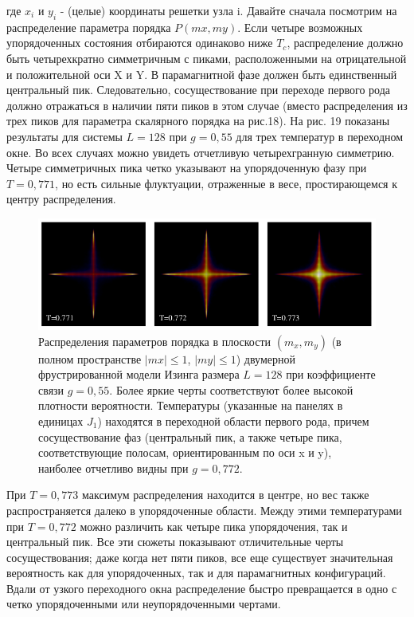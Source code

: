 \documentclass[11pt]{article}
\begin{document}
где $x_i$ и $y_i$ - (целые) координаты решетки узла i. Давайте сначала посмотрим на распределение параметра порядка $P(m x, m y)$. Если четыре возможных упорядоченных состояния отбираются одинаково ниже $T_c$, распределение должно быть четырехкратно симметричным с пиками, расположенными
на отрицательной и положительной оси X и Y. В парамагнитной фазе должен быть единственный центральный пик. Следовательно, сосуществование при переходе первого рода должно отражаться в наличии пяти пиков в этом случае (вместо распределения из трех пиков для параметра скалярного порядка на рис.18). На рис. 19 показаны результаты для системы $L = 128$ при $g = 0,55$ для трех температур в переходном окне. Во всех случаях можно увидеть отчетливую четырехгранную симметрию. Четыре симметричных пика четко указывают на упорядоченную фазу при $T = 0,771$, но есть сильные флуктуации, отраженные в весе, простирающемся к центру распределения.

\begin{figure}[htp]
\centering
\includegraphics[scale=0.5]{fig19}
\caption{Распределения параметров порядка в плоскости $(m_x, m_y)$ (в полном пространстве $| m x | ≤ 1$, $| m y | ≤ 1$) двумерной фрустрированной модели Изинга размера $L = 128$ при коэффициенте связи $g = 0,55$. Более яркие черты соответствуют более высокой плотности вероятности. Температуры (указанные на панелях в единицах $J_1$) находятся в переходной области первого рода, причем сосуществование фаз (центральный пик, а также четыре пика, соответствующие полосам, ориентированным по оси x и y), наиболее отчетливо видны при $g = 0,772$.}
\label{}
\end{figure}


При $T = 0,773$ максимум распределения находится в центре, но вес также распространяется далеко в упорядоченные области. Между этими температурами при $T = 0,772$ можно различить как четыре пика упорядочения, так и центральный пик. Все эти сюжеты показывают отличительные черты сосуществования; даже когда нет пяти пиков, все еще существует значительная вероятность как для упорядоченных, так и для парамагнитных конфигураций. Вдали от узкого переходного окна распределение быстро превращается в одно с четко упорядоченными или неупорядоченными чертами.
\end{document}
